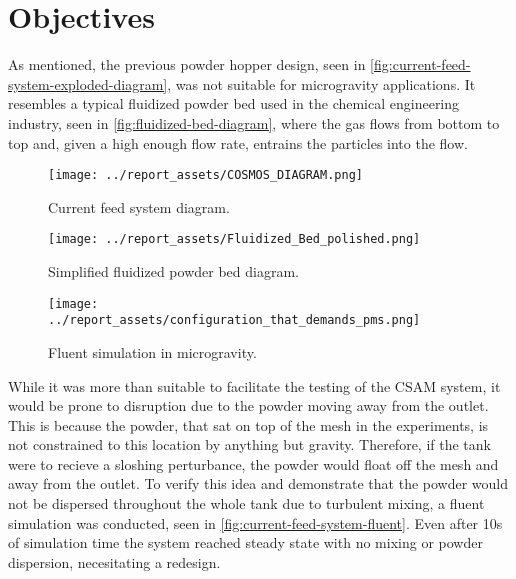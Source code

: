 \section{Objectives}
As mentioned, the previous powder hopper design, seen in \autoref{fig:current-feed-system-exploded-diagram}, was not suitable for microgravity applications. It resembles a typical fluidized powder bed used in the chemical engineering industry, seen in \autoref{fig:fluidized-bed-diagram}, where the gas flows from bottom to top and, given a high enough flow rate, entrains the particles into the flow.
\begin{figure}[htbp]
    \centering

    \begin{minipage}{0.3\textwidth}
        \centering
        \texttt{[image: ../report\_assets/COSMOS\_DIAGRAM.png]}
        \caption{Current feed system diagram.}\label{fig:current-feed-system-exploded-diagram}
    \end{minipage}
    \hfill
    \begin{minipage}{0.3\textwidth}
        \centering
        \texttt{[image: ../report\_assets/Fluidized\_Bed\_polished.png]}
        \caption{Simplified fluidized powder bed diagram.}\label{fig:fluidized-bed-diagram}
    \end{minipage}
    \hfill
    \begin{minipage}{0.3\textwidth}
        \centering
        \texttt{[image: ../report\_assets/configuration\_that\_demands\_pms.png]}
        \caption{Fluent simulation in microgravity.}\label{fig:current-feed-system-fluent}
    \end{minipage}

\end{figure}

While it was more than suitable to facilitate the testing of the CSAM system, it would be prone to disruption due to the powder moving away from the outlet. This is because the powder, that sat on top of the mesh in the experiments, is not constrained to this location by anything but gravity. Therefore, if the tank were to recieve a sloshing perturbance, the powder would float off the mesh and away from the outlet. To verify this idea and demonstrate that the powder would not be dispersed throughout the whole tank due to turbulent mixing, a fluent simulation was conducted, seen in \autoref{fig:current-feed-system-fluent}. Even after 10s of simulation time the system reached steady state with no mixing or powder dispersion, necesitating a redesign.

